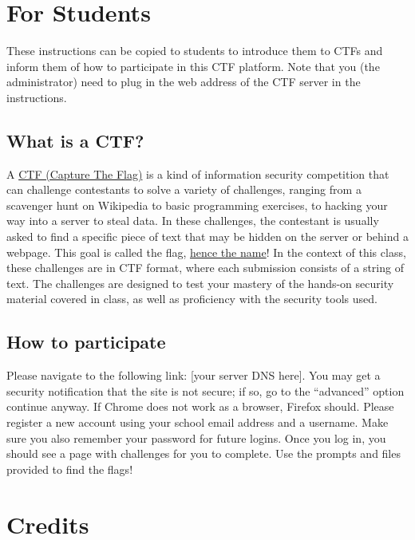 \documentclass[11pt]{article}
\begin{document}
\section{For Students}

These instructions can be copied to students to introduce them to CTFs and inform them of how to participate in this CTF platform.
Note that you (the administrator) need to plug in the web address of the CTF server in the instructions.

\subsection{What is a CTF?}

A \href{https://en.wikipedia.org/wiki/Capture_the_flag_(cybersecurity)}{CTF (Capture The Flag)} is a kind of information security competition that can challenge contestants to solve a variety of challenges, ranging from a scavenger hunt on Wikipedia to basic programming exercises, to hacking your way into a server to steal data.
In these challenges, the contestant is usually asked to find a specific piece of text that may be hidden on the server or behind a webpage.
This goal is called the flag, \href{https://dev.to/atan/what-is-ctf-and-how-to-get-started-3f04}{hence the name}!
In the context of this class, these challenges are in CTF format, where each submission consists of a string of text.
The challenges are designed to test your mastery of the hands-on security material covered in class, as well as proficiency with the security tools used.

\subsection{How to participate}

Please navigate to the following link: [your server DNS here].
You may get a security notification that the site is not secure; if so, go to the ``advanced'' option continue anyway.
If Chrome does not work as a browser, Firefox should.
Please register a new account using your school email address and a username.
Make sure you also remember your password for future logins.
Once you log in, you should see a page with challenges for you to complete.
Use the prompts and files provided to find the flags!

\section{Credits}
\end{document}
